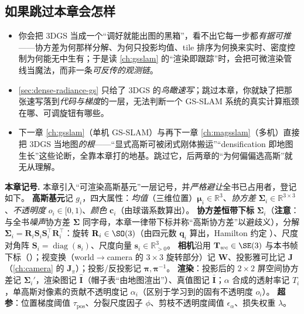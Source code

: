 \subsection*{如果跳过本章会怎样}
\begin{itemize}
  \item 你会把 3DGS 当成一个“调好就能出图的黑箱”，看不出它每一步都\emph{有据可推}——协方差为何那样分解、为何只投影均值、tile 排序为何换来实时、密度控制为何能无中生有；于是读 \cref{ch:gsslam} 的“渲染即跟踪”时，会把可微渲染管线当魔法，而非一条\emph{可反传的观测链}。
  \item \cref{sec:dense-radiance-gs} 只给了 3DGS 的\emph{鸟瞰速写}；跳过本章，你就缺了把那张速写落到\emph{代码与梯度}的一层，无法判断一个 GS-SLAM 系统的真实计算瓶颈在哪、可调旋钮有哪些。
  \item 下一章 \cref{ch:gsslam}（单机 GS-SLAM）与再下一章 \cref{ch:magsslam}（多机）直接把 3DGS 当地图\emph{的根}——“显式高斯可被闭式刚体搬运”“densification 即地图生长”这些论断，全靠本章打的地基。跳过它，后两章的“为何偏偏选高斯”就无从理解。
\end{itemize}

\begin{note}
\textbf{本章记号.}\;
本章引入“可渲染高斯基元”一层记号，并\emph{严格避让}全书已占用者，登记如下。
\textbf{高斯基元}记 $g_i$，四大属性：\emph{均值}（三维位置）$\boldsymbol\mu_i\in\mathbb R^3$、\emph{协方差} $\boldsymbol\Sigma_i\in\mathbb R^{3\times3}$、\emph{不透明度} $o_i\in[0,1)$、\emph{颜色} $\mathbf c_i$（由球谐系数算出）。
\textbf{协方差恒带下标} $\boldsymbol\Sigma_i$（\textbf{注意}：与全书\emph{噪声}协方差 $\boldsymbol\Sigma$ 同字母，本章一律带下标并称“高斯协方差”以避歧义），分解 $\boldsymbol\Sigma_i=\mathbf R_i\mathbf S_i\mathbf S_i^\top\mathbf R_i^\top$：旋转 $\mathbf R_i\in\SO(3)$（由四元数 $\mathbf q_i$ 算出，Hamilton 约定 ）、尺度对角阵 $\mathbf S_i=\operatorname{diag}(\mathbf s_i)$、尺度向量 $\mathbf s_i\in\mathbb R^3_{>0}$。
\textbf{相机}沿用 $\mathbf T_{wc}\in\SE(3)$ 与本书帧下标（）；视变换（world$\to$camera 的 $3\times3$ 旋转部分）记 $\mathbf W$、投影雅可比记 $\mathbf J$（\cref{ch:camera} 的 $\mathbf J_\pi$）；投影/反投影记 $\boldsymbol\pi,\boldsymbol\pi^{-1}$。
\textbf{渲染}：投影后的 $2\times2$ 屏空间协方差记 $\boldsymbol\Sigma_i'$，渲染图记 $\hat{\mathbf I}$（帽子表“由地图渲出”）、真值图记 $\bar{\mathbf I}$；$\alpha$ 合成的透射率记 $T_i$，单高斯对像素的贡献不透明度记 $\alpha_i$（区别于学习到的固有不透明度 $o_i$）。
\textbf{超参}：位置梯度阈值 $\tau_{\mathrm{pos}}$、分裂尺度因子 $\phi$、剪枝不透明度阈值 $\epsilon_\alpha$、损失权重 $\lambda$。
\end{note}

